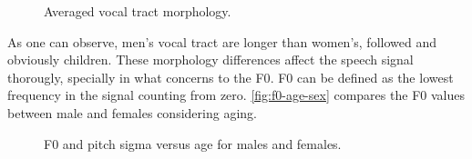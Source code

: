 \begin{figure}[!ht]
        \noindent{}
        \caption{Averaged vocal tract morphology.}
        \label{fig:vocal-tract-morphology}
\end{figure}

As one can observe, men's vocal tract are longer than women's, followed and obviously children. These morphology differences 
affect the speech signal thorougly, specially in what concerns to the \ac{F0}. \ac{F0} can be defined as the 
lowest frequency in the signal counting from zero. \autoref{fig:f0-age-sex} compares the \ac{F0} values
between male and females considering aging.

\begin{figure}[!ht]
        \noindent{}
        \caption{F0 and pitch sigma versus age for males and females.}
        \label{fig:f0-age-sex}
\end{figure}

